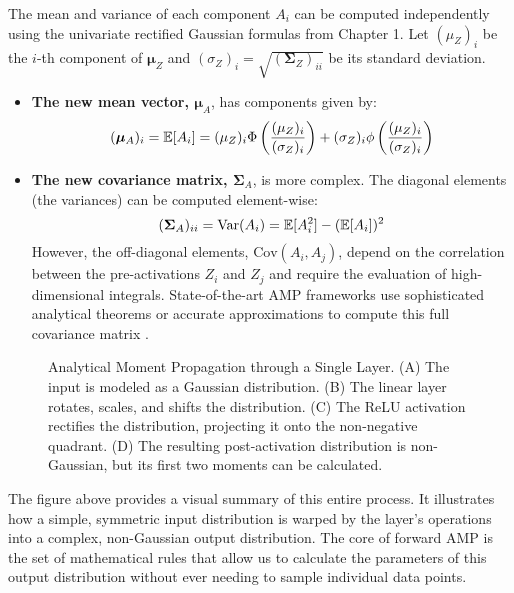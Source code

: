 The mean and variance of each component $A_i$ can be computed independently using the univariate rectified Gaussian formulas from Chapter 1. Let $(\mu_Z)_i$ be the $i$-th component of $\boldsymbol{\mu}_Z$ and $(\sigma_Z)_i = \sqrt{(\boldsymbol{\Sigma}_Z)_{ii}}$ be its standard deviation.
\begin{itemize}
    \item \textbf{The new mean vector, $\boldsymbol{\mu}_A$}, has components given by:
    \begin{equation}
        (\boldsymbol{\mu}_A)_i = \mathbb{E}[A_i] = (\mu_Z)_i \Phi\left(\frac{(\mu_Z)_i}{(\sigma_Z)_i}\right) + (\sigma_Z)_i \phi\left(\frac{(\mu_Z)_i}{(\sigma_Z)_i}\right)
    \end{equation}
    \item \textbf{The new covariance matrix, $\boldsymbol{\Sigma}_A$}, is more complex. The diagonal elements (the variances) can be computed element-wise:
    \begin{equation}
        (\boldsymbol{\Sigma}_A)_{ii} = \text{Var}(A_i) = \mathbb{E}[A_i^2] - (\mathbb{E}[A_i])^2
    \end{equation}
    However, the off-diagonal elements, $\text{Cov}(A_i, A_j)$, depend on the correlation between the pre-activations $Z_i$ and $Z_j$ and require the evaluation of high-dimensional integrals. State-of-the-art AMP frameworks use sophisticated analytical theorems or accurate approximations to compute this full covariance matrix \cite{Wright2024AnalyticCovariance, FreyHinton1999Transformations}.
\end{itemize}

\begin{figure}[h!]
    \centering
    \scalebox{0.7}{\amplayerdiagram}
    \caption{Analytical Moment Propagation through a Single Layer. (A) The input is modeled as a Gaussian distribution. (B) The linear layer rotates, scales, and shifts the distribution. (C) The ReLU activation rectifies the distribution, projecting it onto the non-negative quadrant. (D) The resulting post-activation distribution is non-Gaussian, but its first two moments can be calculated.}
    \label{fig:amp_layer}
\end{figure}

The figure above provides a visual summary of this entire process. It illustrates how a simple, symmetric input distribution is warped by the layer's operations into a complex, non-Gaussian output distribution. The core of forward AMP is the set of mathematical rules that allow us to calculate the parameters of this output distribution without ever needing to sample individual data points.

\ifdefined\ispartofbook
\else
  
\fi
